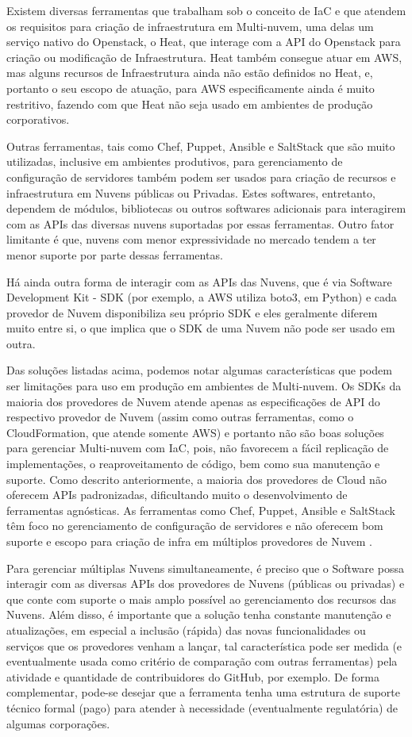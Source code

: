 \documentclass[12pt]{article}
\begin{document}
	Existem diversas ferramentas que trabalham sob o conceito de IaC e que atendem os requisitos para criação de infraestrutura em Multi-nuvem, uma delas um serviço nativo do Openstack, o Heat, que interage com a API do Openstack para criação ou modificação de Infraestrutura. Heat também consegue atuar em AWS, mas alguns recursos de Infraestrutura ainda não estão definidos no Heat, e, portanto o seu escopo de atuação, para AWS especificamente ainda é muito restritivo, fazendo com que Heat não seja usado em ambientes de produção corporativos. 
	
	Outras ferramentas, tais como Chef, Puppet, Ansible e SaltStack que são muito utilizadas, inclusive em ambientes produtivos, para gerenciamento de configuração de servidores também podem ser usados para criação de recursos e infraestrutura em Nuvens públicas ou Privadas. Estes softwares, entretanto, dependem de módulos, bibliotecas ou outros softwares adicionais para interagirem com as APIs das diversas nuvens suportadas por essas ferramentas. Outro fator limitante é que, nuvens com menor expressividade no mercado tendem a ter menor suporte por parte dessas ferramentas.
	
	Há ainda outra forma de interagir com as APIs das Nuvens, que é via Software Development Kit - SDK (por exemplo, a AWS utiliza boto3, em Python) e cada provedor de Nuvem disponibiliza seu próprio SDK e eles geralmente diferem muito entre si, o que implica que o SDK de uma Nuvem não pode ser usado em outra.
	
	Das soluções listadas acima, podemos notar algumas características que podem ser limitações para uso em produção em ambientes de Multi-nuvem. Os SDKs da maioria dos provedores de Nuvem atende apenas as especificações de API do respectivo provedor de Nuvem (assim como outras ferramentas, como o CloudFormation, que atende somente AWS) e portanto não são boas soluções para gerenciar Multi-nuvem com IaC, pois, não favorecem a fácil replicação de implementações, o reaproveitamento de código, bem como sua manutenção e suporte. Como descrito anteriormente, a maioria dos provedores de Cloud não oferecem APIs padronizadas, dificultando muito o desenvolvimento de ferramentas agnósticas. As ferramentas como Chef, Puppet, Ansible e SaltStack têm foco no gerenciamento de configuração de servidores e não oferecem bom suporte e escopo para criação de infra em múltiplos provedores de Nuvem \cite{Morris:2016}.
	
	Para gerenciar múltiplas Nuvens simultaneamente, é preciso que o Software possa interagir com as diversas APIs dos provedores de Nuvens (públicas ou privadas) e que conte com suporte o mais amplo possível ao gerenciamento dos recursos das Nuvens. Além disso, é importante que a solução tenha constante manutenção e atualizações, em especial a inclusão (rápida) das novas funcionalidades ou serviços que os provedores venham a lançar, tal característica pode ser medida (e eventualmente usada como critério de comparação com outras ferramentas) pela atividade e quantidade de contribuidores do GitHub, por exemplo. De forma complementar, pode-se desejar que a ferramenta tenha uma estrutura de suporte técnico formal (pago) para atender à necessidade (eventualmente regulatória) de algumas corporações.
	
\end{document}
